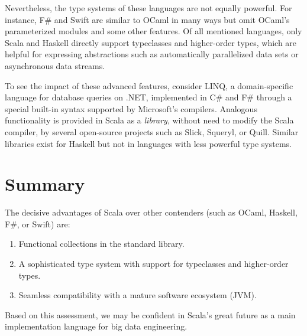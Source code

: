 Nevertheless, the type systems of these languages are not equally
powerful. For instance, F\# and Swift are similar to OCaml in many
ways but omit OCaml's parameterized modules and some other features.
Of all mentioned languages, only Scala and Haskell directly support
typeclasses and higher-order types, which are helpful for expressing
abstractions such as automatically parallelized data sets or asynchronous
data streams.

To see the impact of these advanced features, consider LINQ, a domain-specific
language for database queries on .NET, implemented in C\# and F\#
through a special built-in syntax supported by Microsoft's compilers.
Analogous functionality is provided in Scala as a \emph{library},
without need to modify the Scala compiler, by several open-source
projects such as Slick, Squeryl, or Quill. Similar libraries exist
for Haskell \textemdash{} but not in languages with less powerful
type systems.

\section{Summary}

The decisive advantages of Scala over other contenders (such as OCaml,
Haskell, F\#, or Swift) are:
\begin{enumerate}
\item Functional collections in the standard library.
\item A sophisticated type system with support for typeclasses and higher-order
types.
\item Seamless compatibility with a mature software ecosystem (JVM).
\end{enumerate}
Based on this assessment, we may be confident in Scala's great future
as a main implementation language for big data engineering. 

